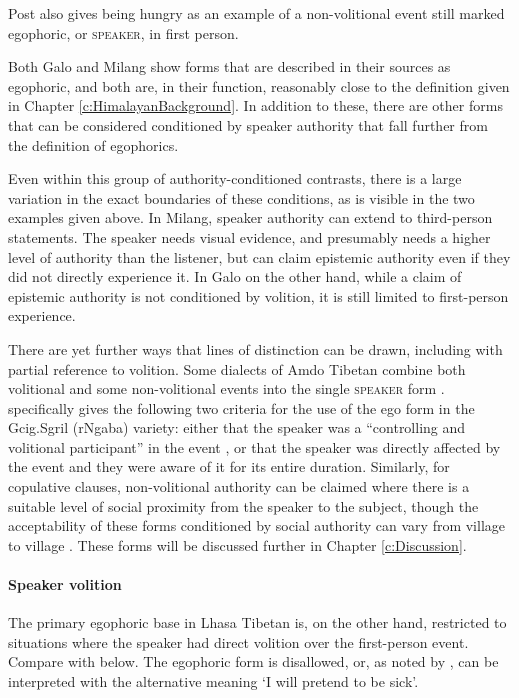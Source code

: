 Post also gives being hungry as an example of a non-volitional event still marked egophoric, or \textsc{speaker}, in first person.

Both Galo and Milang show forms that are described in their sources as egophoric, and both are, in their function, reasonably close to the definition given in Chapter \ref{c:HimalayanBackground}. In addition to these, there are other forms that can be considered conditioned by speaker authority that fall further from the definition of egophorics.


Even within this group of authority-conditioned contrasts, there is a large variation in the exact boundaries of these conditions, as is visible in the two examples given above. In Milang, speaker authority can extend to third-person statements. The speaker needs visual evidence, and presumably needs a higher level of authority than the listener, but can claim epistemic authority even if they did not directly experience it. In Galo on the other hand, while a claim of epistemic authority is not conditioned by volition, it is still limited to first-person experience.

There are yet further ways that lines of distinction can be drawn, including with partial reference to volition. Some dialects of Amdo Tibetan combine both volitional and some non-volitional events into the single \textsc{speaker} form \cite{Tribur2019}.  specifically gives the following two criteria for the use of the ego form in the Gcig.Sgril (rNgaba) variety: either that the speaker was a ``controlling and volitional participant'' in the event \cite[383]{Tribur2019}, or that the speaker was directly affected by the event and they were aware of it for its entire duration. Similarly, for copulative clauses, non-volitional authority can be claimed where there is a suitable level of social proximity from the speaker to the subject, though the acceptability of these forms conditioned by social authority can vary from village to village \cite[213]{Tribur2019}. These forms will be discussed further in Chapter \ref{c:Discussion}.

\paragraph{Speaker volition}
The primary egophoric base in Lhasa Tibetan is, on the other hand, restricted to situations where the speaker had direct volition over the first-person event. Compare  with  below. The egophoric form is disallowed, or, as noted by , can be interpreted with the alternative meaning `I will pretend to be sick'.

